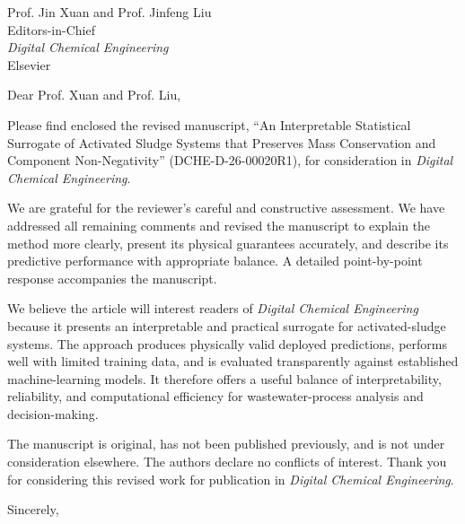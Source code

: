 \documentclass[11pt]{letter}
\date{July 16, 2026}
\begin{document}
\begin{letter}{Prof. Jin Xuan and Prof. Jinfeng Liu\\
Editors-in-Chief\\
\textit{Digital Chemical Engineering}\\
Elsevier}

\opening{Dear Prof. Xuan and Prof. Liu,}

Please find enclosed the revised manuscript, ``An Interpretable Statistical Surrogate of Activated Sludge Systems that Preserves Mass Conservation and Component Non-Negativity'' (DCHE-D-26-00020R1), for consideration in \textit{Digital Chemical Engineering}.

We are grateful for the reviewer's careful and constructive assessment. We have addressed all remaining comments and revised the manuscript to explain the method more clearly, present its physical guarantees accurately, and describe its predictive performance with appropriate balance. A detailed point-by-point response accompanies the manuscript.

We believe the article will interest readers of \textit{Digital Chemical Engineering} because it presents an interpretable and practical surrogate for activated-sludge systems. The approach produces physically valid deployed predictions, performs well with limited training data, and is evaluated transparently against established machine-learning models. It therefore offers a useful balance of interpretability, reliability, and computational efficiency for wastewater-process analysis and decision-making.

The manuscript is original, has not been published previously, and is not under consideration elsewhere. The authors declare no conflicts of interest. Thank you for considering this revised work for publication in \textit{Digital Chemical Engineering}.

\closing{Sincerely,}

\end{letter}
\end{document}
